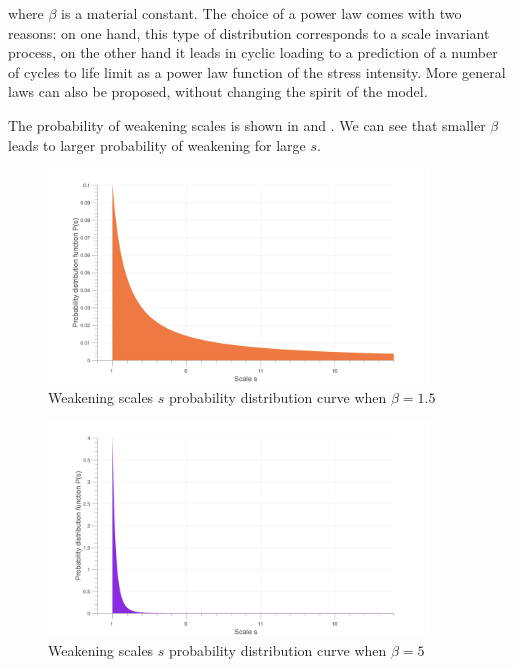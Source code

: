 where $\beta$ is a material constant. 
The choice of a power law comes with two reasons: on one hand, this type of distribution corresponds to a scale invariant process, on the other hand it leads in cyclic loading to a prediction of a number of cycles to life limit as a power law function of the stress intensity. More general laws can also be proposed, without changing the spirit of the model.

The probability of weakening scales is shown in  and . We can see that smaller $\beta$ leads to larger probability of weakening for large $s$.
\begin{figure}[!h]
\centering
\includegraphics[width=0.9\textwidth]{figures//ps1.png} 
\caption{Weakening scales $s$ probability distribution curve when $\beta=1.5$ }
\label{ps1}
\end{figure}
\begin{figure}[!h]
\centering
\includegraphics[width=0.9\textwidth]{figures//ps2.png} 
\caption{Weakening scales $s$ probability distribution curve when $\beta=5$ }
\label{ps2}
\end{figure}

